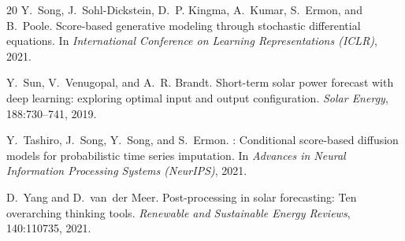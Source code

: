 \documentclass{article}
\begin{document}
\begin{thebibliography}{20}
Y.~Song, J.~Sohl-Dickstein, D.~P. Kingma, A.~Kumar, S.~Ermon, and B.~Poole.
\newblock Score-based generative modeling through stochastic differential equations.
\newblock In \emph{International Conference on Learning Representations (ICLR)}, 2021.

Y.~Sun, V.~Venugopal, and A.~R. Brandt.
\newblock Short-term solar power forecast with deep learning: exploring optimal input and output configuration.
\newblock \emph{Solar Energy}, 188:730--741, 2019.

Y.~Tashiro, J.~Song, Y.~Song, and S.~Ermon.
: Conditional score-based diffusion models for probabilistic time series imputation.
\newblock In \emph{Advances in Neural Information Processing Systems (NeurIPS)}, 2021.

D.~Yang and D.~van~der Meer.
\newblock Post-processing in solar forecasting: Ten overarching thinking tools.
\newblock \emph{Renewable and Sustainable Energy Reviews}, 140:110735, 2021.

\end{thebibliography}
\end{document}
